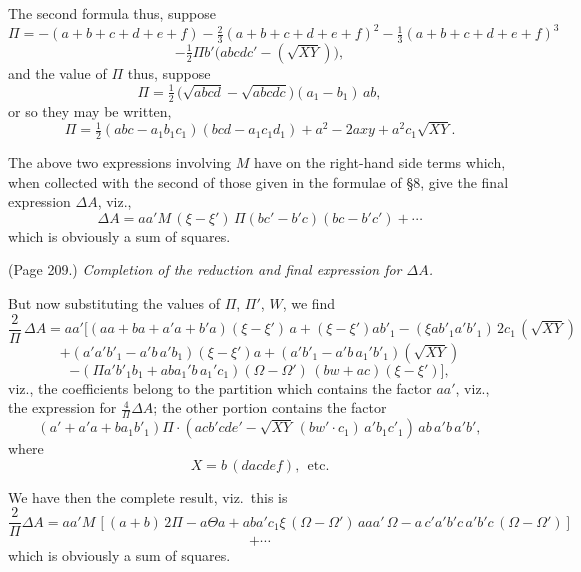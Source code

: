 \documentclass[11pt,a4paper]{book}
\begin{document}
The second formula thus, suppose
\[
\Pi = -(a + b + c + d + e + f) - \tfrac{2}{3}(a + b + c + d + e + f)^2 - \tfrac{1}{3}(a + b + c + d + e + f)^3
\]
\[
- \tfrac{1}{2}\Pi b' \big(abc d c' - (\sqrt{X Y})\big),
\]
and the value of $\Pi$ thus, suppose
\[
\Pi = \tfrac{1}{2}\,\big(\sqrt{a b c d} - \sqrt{a b c d c}\big) (a_1 - b_1)\,a b,
\]
or so they may be written,
\[
\Pi = \tfrac{1}{2} (a b c - a_1 b_1 c_1)(b c d - a_1 c_1 d_1) + a^2 - 2 a x y + a^2 c_1 \sqrt{X Y}.
\]

The above two expressions involving $M$ have on the right-hand side terms which, when collected with the second of those given in the formulae of \S 8, give the final expression $\Delta A$, viz.,
\[
\Delta A = a a' M\,(\xi - \xi')\,\Pi (b c' - b' c)(b c - b' c') + \cdots
\]
which is obviously a sum of squares.

\medskip

\noindent (Page 209.) \emph{Completion of the reduction and final expression for $\Delta A$.}

But now substituting the values of $\Pi$, $\Pi'$, $W$, we find
\[
\frac{2}{\Pi}\,\Delta A = a a' \Big[ (a a + b a + a' a + b' a)(\xi - \xi')\,a + (\xi - \xi') a b'_1 - (\xi a b'_1 a' b'_1)\,2 c_1\,(\sqrt{X Y})
\]
\[
+ (a' a' b'_1 - a' b\,a' b_1)(\xi - \xi') a + (a' b'_1 - a' b\,a_1' b'_1) (\sqrt{X Y})
\]
\[
- (\Pi a' b'_1 b_1 + a b a_1' b\,a_1' c_1) (\Omega - \Omega')\,(b w + a c) (\xi - \xi')\Big],
\]
viz., the coefficients belong to the partition which contains the factor $aa'$, viz., the expression for $\frac{4}{\Pi}\Delta A$; the other portion contains the factor
\[
( a' + a' a + b a_1 b'_1)\Pi \cdot (a c b' c d e' - \sqrt{X Y}\,(b w' \cdot c_1)\,a' b_1 c'_1)\,a b\,a' b\,a' b',
\]
where
\[
X = b\,(d a c d e f),\ \ \text{etc.}
\]

We have then the complete result, viz.\ this is
\[
\frac{2}{\Pi}\Delta A = a a' M\,[(a + b)\,2\Pi - a \Theta a + a b a' c_1 \xi\,(\Omega - \Omega')\,a a a'\,\Omega - a\,c' a' b' c\,a' b' c\,(\Omega - \Omega')]
\]
\[
+ \cdots
\]
which is obviously a sum of squares.

\medskip
\end{document}
